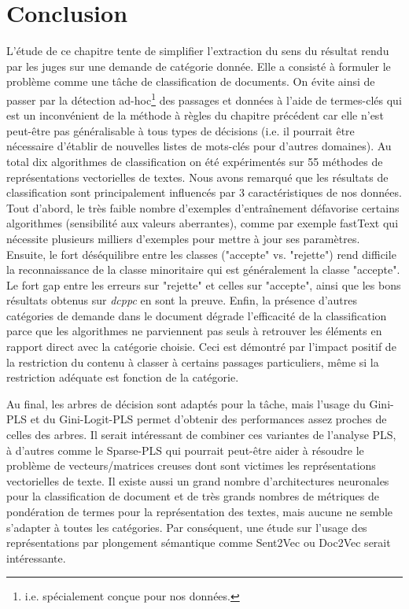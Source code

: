 \section{Conclusion}
\label{sec:sensresultat:conclusion}
L'étude de ce chapitre tente de simplifier l'extraction du sens du résultat rendu par les juges sur une demande de catégorie donnée. Elle a consisté à formuler le problème comme une tâche de classification de documents. On évite ainsi de passer par la détection ad-hoc\footnote{i.e. spécialement conçue pour nos données.} des passages et données à l'aide de termes-clés qui est un inconvénient de la méthode à règles du chapitre précédent car elle n'est peut-être pas généralisable à tous types de décisions (i.e. il pourrait être nécessaire d'établir de nouvelles listes de mots-clés pour d'autres domaines). Au total dix algorithmes de classification on été expérimentés sur 55 méthodes de représentations vectorielles de textes. Nous avons remarqué que les résultats de classification sont principalement influencés par 3 caractéristiques de nos données. Tout d'abord, le très faible nombre d'exemples d'entraînement défavorise certains algorithmes (sensibilité aux valeurs aberrantes), comme par exemple fastText qui nécessite plusieurs milliers d'exemples pour mettre à jour ses paramètres. Ensuite, le fort déséquilibre entre les classes ("accepte" vs. "rejette") rend difficile la reconnaissance de la classe minoritaire qui est généralement la classe "accepte". Le fort gap entre les erreurs sur "rejette" et celles sur "accepte", ainsi que les bons résultats obtenus sur \textit{dcppc} en sont la preuve. Enfin, la présence d'autres catégories de demande dans le document dégrade l'efficacité de la classification parce que les algorithmes ne parviennent pas seuls à retrouver les éléments en rapport direct avec la catégorie choisie. Ceci est démontré par l'impact positif de la restriction du contenu à classer à certains passages particuliers, même si la restriction adéquate est fonction de la catégorie.
 
Au final, les arbres de décision sont adaptés pour la tâche, mais l'usage du Gini-PLS et du Gini-Logit-PLS permet d'obtenir des performances assez proches de celles des arbres.
Il serait intéressant de combiner ces variantes de l'analyse PLS, à d'autres comme le Sparse-PLS qui pourrait peut-être aider à résoudre le problème de vecteurs/matrices creuses dont sont victimes les représentations vectorielles de texte. Il existe aussi un grand nombre d'architectures neuronales pour la classification de document et de très grands nombres de métriques de pondération de termes pour la représentation des textes, mais aucune ne semble s'adapter à toutes les catégories. Par conséquent, une étude sur l'usage des représentations par plongement sémantique comme Sent2Vec \citep{pagliardini2017sent2vec} ou Doc2Vec \citep{quoc2014doc2vec} serait intéressante.
